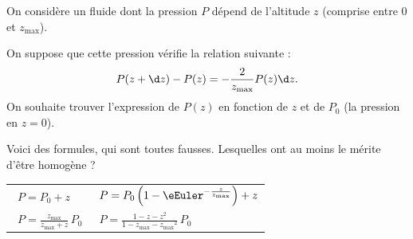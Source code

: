 







\hauteurLargeurCadreReponse		{6mm}{7cm}
\initialisationEntrainement

On considère un fluide dont la pression $P$ dépend de l'altitude $z$ (comprise entre $0$ et $z_{\text{max}}$).

On suppose que cette pression vérifie la relation suivante : 
\[
P(z+\d z) - P(z) = -\frac{2}{z_{\text{max}}} P(z) \d z.
\]
On souhaite trouver l'expression de $P(z)$ en fonction de $z$ et de $P_0$ (la pression en $z=0$).

\debutEntrainement


\begin{enonce}
Voici des formules, qui sont toutes fausses. Lesquelles ont au moins le mérite d'être homogène ?

\begin{center}
\begin{tabular}{ll}
\reponseA{} \ $P = P_0 + z$ & \reponseB{} \ $P = P_0\left (1-\eEuler^{-\frac{z}{z_{\text{max}}}}\right ) + z$ \\[3mm]
\reponseC{} \ $P = \frac{z_{\text{max}}}{z_{\text{max}} + z}\, P_0$ \qquad\qquad & \reponseD{} \ $P = \frac{1-z-z^2}{1-z_{\text{max}} - {{z_{\text{max}}}^2}}\, P_0$
\end{tabular}
\end{center}

\end{enonce}

